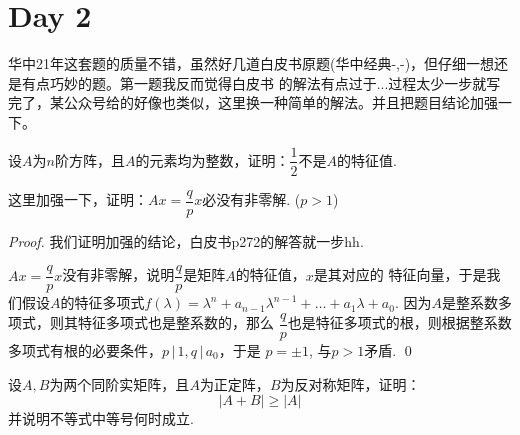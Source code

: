 \section*{Day 2}

华中21年这套题的质量不错，虽然好几道白皮书原题(华中经典-,-)，但仔细一想还是有点巧妙的题。第一题我反而觉得白皮书
的解法有点过于...过程太少一步就写完了，某公众号给的好像也类似，这里换一种简单的解法。并且把题目结论加强一下。

\begin{ex}[华中2021]
	设$A$为$n$阶方阵，且$A$的元素均为整数，证明：$\dfrac{1}{2}$不是$A$的特征值.

	这里加强一下，证明：$Ax=\dfrac{q}{p}x$必没有非零解. ($p>1$)
\end{ex}

\begin{proof}
	我们证明加强的结论，白皮书p272的解答就一步hh. 

	$Ax=\dfrac{q}{p}x$没有非零解，说明$\dfrac{q}{p}$是矩阵$A$的特征值，$x$是其对应的
	特征向量，于是我们假设$A$的特征多项式$f(\lambda) = \lambda^n + a_{n-1}\lambda^{n-1}
	+ \dots + a_1 \lambda + a_0$. 因为$A$是整系数多项式，则其特征多项式也是整系数的，那么
	$\dfrac{q}{p}$也是特征多项式的根，则根据整系数多项式有根的必要条件，$p \,|\, 1, q \,|\, a_0$，于是
	$p=\pm 1$, 与$p>1$矛盾.
	\qed{}
\end{proof}

\begin{ex}[华中2021]
	设$A,B$为两个同阶实矩阵，且$A$为正定阵，$B$为反对称矩阵，证明：
	$$
		| A + B | \geq | A |
	$$
	并说明不等式中等号何时成立.
\end{ex}

